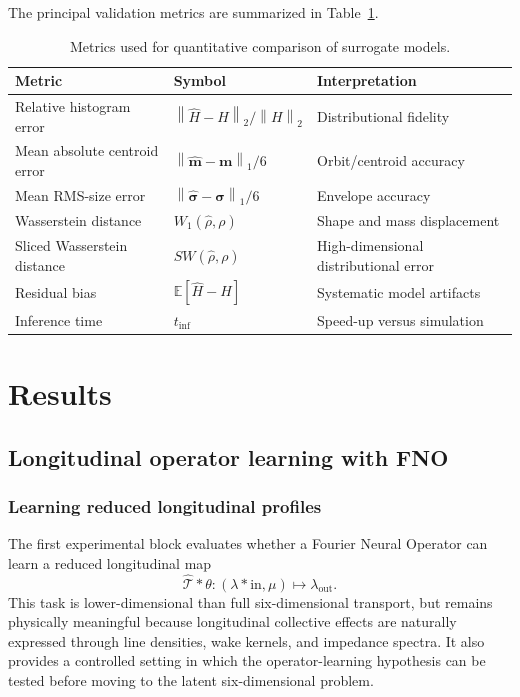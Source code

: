 \documentclass[11pt,a4paper]{article}
\providecommand{\norm}[1]{\left\lVert#1\right\rVert}
\providecommand{\E}{\mathbb{E}}
\begin{document}
\begin{sloppypar}
The principal validation metrics are summarized in Table~\ref{tab:metrics_definitions}.

\begin{table}[H]
\centering
\caption{Metrics used for quantitative comparison of surrogate models.}
\label{tab:metrics_definitions}
\begin{tabular}{lll}
\toprule
Metric & Symbol & Interpretation \\
\midrule
Relative histogram error & $\norm{\widehat{H}-H}_2/\norm{H}_2$ & Distributional fidelity \\
Mean absolute centroid error & $\norm{\widehat{\bm m}-\bm m}_1/6$ & Orbit/centroid accuracy \\
Mean RMS-size error & $\norm{\widehat{\bm\sigma}-\bm\sigma}_1/6$ & Envelope accuracy \\
Wasserstein distance & $W_1(\widehat{\rho},\rho)$ & Shape and mass displacement \\
Sliced Wasserstein distance & $SW(\widehat{\rho},\rho)$ & High-dimensional distributional error \\
Residual bias & $\E[\widehat{H}-H]$ & Systematic model artifacts \\
Inference time & $t_{\mathrm{inf}}$ & Speed-up versus simulation \\
\bottomrule
\end{tabular}
\end{table}
\section{Results}
\label{sec:results}

\subsection{Longitudinal operator learning with FNO}
\label{subsec:results_fno}

\subsubsection{Learning reduced longitudinal profiles}
\label{subsubsec:fno_longitudinal_profiles}

The first experimental block evaluates whether a Fourier Neural Operator can learn a reduced longitudinal map
\begin{equation}
\widehat{\mathcal{T}}*{\theta}
:
(\lambda*{\mathrm{in}},\mu)
\mapsto
\lambda_{\mathrm{out}}.
\label{eq:fno_longitudinal_map_results}
\end{equation}
This task is lower-dimensional than full six-dimensional transport, but remains physically meaningful because longitudinal collective effects are naturally expressed through line densities, wake kernels, and impedance spectra. It also provides a controlled setting in which the operator-learning hypothesis can be tested before moving to the latent six-dimensional problem.


\end{sloppypar}
\end{document}
